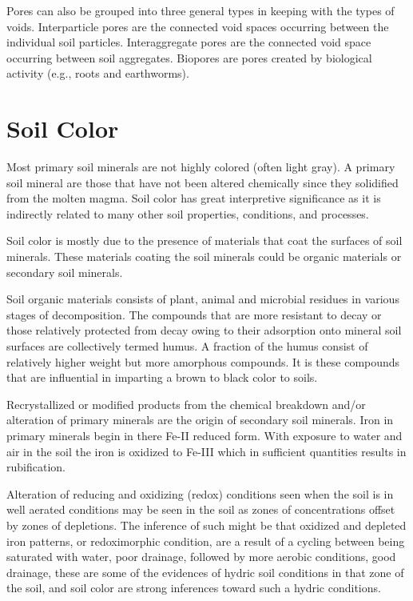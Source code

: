 \documentclass{article}
\begin{document}
Pores can also be grouped into three general types in keeping with the types of voids. Interparticle pores are the connected void spaces occurring between the individual soil particles. Interaggregate pores are the connected void space occurring between soil aggregates. Biopores are pores created by biological activity (e.g., roots and earthworms).

\section{Soil Color}
\label{color}
    
Most primary soil minerals are not highly colored (often light gray). A primary soil mineral are those that have not been altered chemically since they solidified from the molten magma. Soil color has great interpretive significance as it is indirectly related to many other soil properties, conditions, and processes.

Soil color is mostly due to the presence of materials that coat the surfaces of soil minerals. These materials coating the soil minerals could be organic materials or secondary soil minerals.

Soil organic materials consists of plant, animal and microbial residues in various stages of decomposition. The compounds that are more resistant to decay or those relatively protected from decay owing to their adsorption onto mineral soil surfaces are  collectively termed humus. A fraction of the humus consist of relatively higher weight but more amorphous compounds. It is these compounds that are influential in imparting a brown to black color to soils.

Recrystallized or modified products from the chemical breakdown and/or alteration of primary minerals are the origin of secondary soil minerals. Iron in primary minerals begin in there Fe-II reduced form. With exposure to water and air in the soil the iron is oxidized to Fe-III which in sufficient quantities results in rubification.
 
Alteration of reducing and oxidizing (redox) conditions seen when the soil is in well aerated conditions may be seen in the soil as zones of concentrations offset by zones of depletions. The inference of such might be that oxidized and depleted iron patterns, or redoximorphic condition, are a result of a cycling between being saturated with water, poor drainage, followed by more aerobic conditions, good drainage, these are some of the evidences of hydric soil conditions in that zone of the soil, and soil color are strong inferences toward such a hydric conditions.
    
\end{document}
